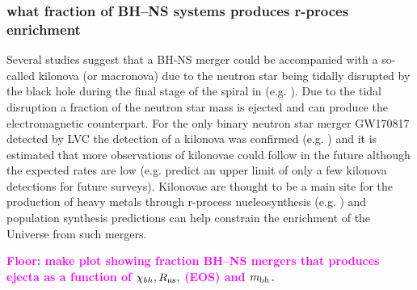 \documentclass[a4paper,fleqn,usenatbib,useAMS,usedcolumn]{mnras}
\newcommand{\floor}[1]{\textbf{\textcolor{magenta}{#1}}}
\begin{document}
\subsubsection{what fraction of BH--NS systems produces r-proces enrichment}
\label{EMcounterparts}
Several studies suggest that a BH-NS merger could be accompanied with a so-called kilonova (or macronova) due to the neutron star being  tidally disrupted by the black hole during the final stage of the spiral in (e.g. \citealt{1974ApJ...192L.145L, 1976ApJ...210..549L, Li:1998bw, Rosswog:1998gc,doi:10.1093/mnras/stv009, 2010MNRAS.406.2650M}). Due to the tidal disruption a fraction of the neutron star mass is ejected and can produce the electromagnetic counterpart. For the only binary neutron star merger GW170817  detected by LVC the detection of a kilonova was confirmed   (e.g. \citealt{2017ApJ...850L..39A,2017ApJ...848L..12A,2017Natur.551...64A, Chornock:2017sdf, Coulter:2017wya,2017NatAs...1..791C, 2017ApJ...848L..17C,2017Sci...358.1570D,2017Sci...358.1565E, 2017Natur.551...80K, 2017ApJ...848L..34M, 2017ApJ...848L..18N,2017PASJ...69..102T,2017Natur.551...75S, 2017ApJ...848L..27T,   2017ApJ...848L..24V}) and it is estimated that more observations of kilonovae could follow in the future although the expected rates are  low (e.g.  \citealt{2017ApJ...851L..48Y, 2018ApJ...852L...3S} predict an upper limit of  only  a few kilonova detections for future surveys). 
Kilonovae are thought to be a main site for the production of heavy metals through r-process nucleosynthesis (e.g. \citealt{2015ApJ...807..115S, doi:10.1093/mnras/stu2404}) and population synthesis predictions can  help constrain the enrichment of the Universe from such mergers. 

\floor{Floor: make plot showing fraction BH--NS mergers that produces ejecta as a function of $\chi_{bh}, R_{\rm{ns}},$ (EOS) and $m_{\rm{bh}}$. }




\end{document}
